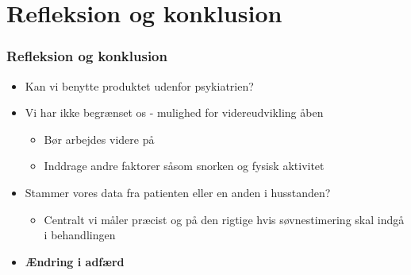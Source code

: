 \section{Refleksion og konklusion}
\begin{frame}
\frametitle{Refleksion og konklusion}
\begin{itemize}
	\item Kan vi benytte produktet udenfor psykiatrien?
	\item Vi har ikke begrænset os - mulighed for videreudvikling åben
	\begin{itemize}
		\item Bør arbejdes videre på
		\item Inddrage andre faktorer såsom snorken og fysisk aktivitet
	\end{itemize}
	\item Stammer vores data fra patienten eller en anden i husstanden?
	\begin{itemize}
		\item Centralt vi måler præcist og på den rigtige hvis søvnestimering skal indgå i behandlingen
	\end{itemize}
	\item \textbf{Ændring i adfærd}
\end{itemize}
\end{frame}

